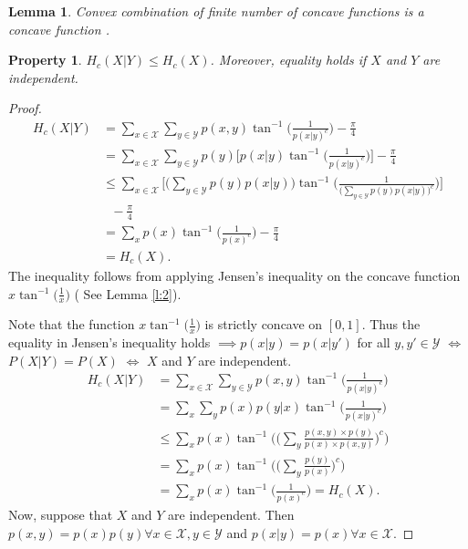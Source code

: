 \documentclass{article}
\newtheorem{lem}{Lemma}
\newtheorem{prop}{Property}
\begin{document}
\begin{lem}\label{lem3}
Convex combination of finite number of concave functions is a concave function \citep{boyd2004convex}.
\end{lem}

\begin{prop}
\label{p:cond}
 $H_c(X|Y)\leq H_c(X)$. Moreover, equality holds if $X$ and $Y$ are independent.
\end{prop}
\begin{proof}
\begin{align*}
     H_c(X|Y) & = \sum_{x\in\mathcal{X}}\sum_{y\in\mathcal{Y}} p(x,y)\tan^{-1}\bigg(\frac{1}{p(x|y)^c}\bigg) -\frac{\pi}{4} \\
    & = \sum_{x\in\mathcal{X}}\sum_{y\in\mathcal{Y}} p(y)\bigg[p(x|y)\tan^{-1}\bigg(\frac{1}{p(x|y)^c}\bigg)\bigg] -\frac{\pi}{4}\\
    & \leq \sum_{x\in\mathcal{X}}\bigg[\big(\sum_{y\in\mathcal{Y}} p(y) p(x|y)\big)\tan^{-1}\bigg(\frac{1}{\big(\sum_{y\in\mathcal{Y}} p(y) p(x|y)\big)^c}\bigg)\bigg] \\
    & \text{  }-\frac{\pi}{4}\\
    & = \sum_x p(x)\tan^{-1}\bigg(\frac{1}{p(x)^c}\bigg) -\frac{\pi}{4}\\
    & = H_c(X).
\end{align*}
The inequality follows from applying Jensen's inequality \citep{jensen1906fonctions} on the concave function  $x\tan^{-1}\big(\frac{1}{x}\big)$ ( See Lemma \ref{l:2}).\par
Note that the function $x\tan^{-1}\big(\frac{1}{x}\big)$ is strictly concave on $[0,1]$. Thus the equality in Jensen's inequality holds  $ \implies p(x|y)=p(x|y')$ for all $y,y' \in \mathcal{Y}$ $\iff$ $P(X|Y)=P(X)$ $\iff$ $X$ and $Y$ are independent.
\begin{align*}
 H_c(X|Y) & = \sum_{x\in\mathcal{X}}\sum_{y\in\mathcal{Y}} p(x,y)\tan^{-1}\bigg(\frac{1}{p(x|y)^c}\bigg) \\
 & = \sum_x\sum_y p(x)p(y|x)\tan^{-1}\bigg(\frac{1}{p(x|y)^c}\bigg)\\
 & \leq \sum_x p(x)\tan^{-1}\Bigg(\bigg(\sum_y\frac{p(x,y) \times p(y)}{p(x)\times p(x,y)}\bigg)^c\Bigg) \\
 & = \sum_x p(x)\tan^{-1}\Bigg(\bigg(\sum_y\frac{p(y)}{p(x)}\bigg)^c\Bigg) \\
 & = \sum_x p(x)\tan^{-1}\bigg(\frac{1}{p(x)^c}\bigg) = H_c(X).   
\end{align*}
Now, suppose that $X$ and $Y$ are independent. Then $p(x,y)=p(x)p(y) \forall x\in \mathcal{X}, y\in \mathcal{Y}$ and $p(x|y)=p(x)\forall x\in \mathcal{X}$.

\end{proof}
\end{document}
